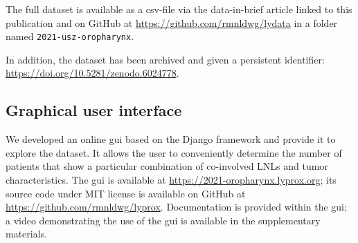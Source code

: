\documentclass[\relativeRoot/main.tex]{subfiles}
\begin{document}
The full dataset is available as a \gls{csv}-file via the data-in-brief article linked to this publication \cite{ludwig_dataset_2021} and on GitHub at \url{https://github.com/rmnldwg/lydata} in a folder named \verb|2021-usz-oropharynx|.

In addition, the dataset has been archived and given a persistent identifier: \url{https://doi.org/10.5281/zenodo.6024778}.

\subsection{Graphical user interface}

We developed an online \gls{gui} based on the Django framework \cite{noauthor_django_2021} and provide it to explore the dataset. It allows the user to conveniently determine the number of patients that show a particular combination of co-involved LNLs and tumor characteristics. The \gls{gui} is available at \url{https://2021-oropharynx.lyprox.org}; its source code under MIT license is available on GitHub at \url{https://github.com/rmnldwg/lyprox}. Documentation is provided within the \gls{gui}; a video demonstrating the use of the \gls{gui} is available in the supplementary materials.
\end{document}
